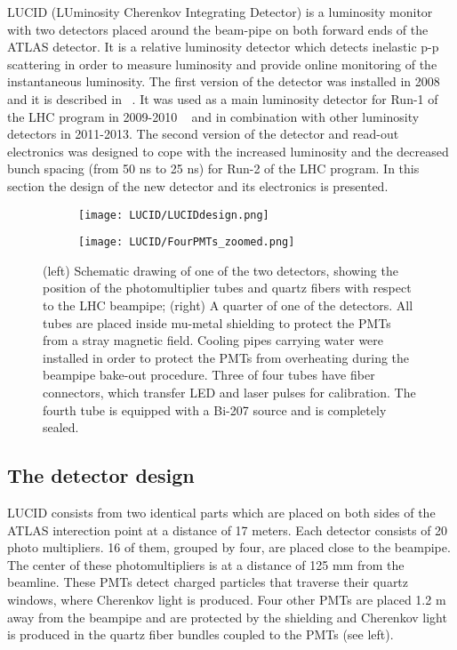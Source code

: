 LUCID (LUminosity Cherenkov Integrating Detector) is a luminosity monitor with two detectors placed around the beam-pipe on both forward ends of the ATLAS detector.
It is a relative luminosity detector which detects inelastic p-p scattering in order to measure luminosity and provide online monitoring of the instantaneous luminosity.
The first version of the detector was installed in 2008 and it is described in ~\cite{Aad:2008zzm}.
It was used as a main luminosity detector for Run-1 of the LHC program in 2009-2010 ~\cite{Aad:2013ucp} and in combination with other luminosity detectors in 2011-2013.
The second version of the detector and read-out electronics was designed to cope with 
the increased luminosity and the decreased bunch spacing (from 50 ns to 25 ns) for Run-2 of the LHC program.
In this section the design of the new detector and its electronics is presented. 

\begin{figure}
\centering
\begin{subfigure}{.5\textwidth}
  \centering
  \texttt{[image: LUCID/LUCIDdesign.png]}
\end{subfigure}%
\begin{subfigure}{.5\textwidth}
  \centering
  \texttt{[image: LUCID/FourPMTs\_zoomed.png]}
\end{subfigure}
\caption{(left) Schematic drawing of one of the two detectors, showing the position of the photomultiplier tubes 
and quartz fibers with respect to the LHC beampipe; (right) A quarter of one of the detectors. All tubes are 
placed inside mu-metal shielding to protect the PMTs from a stray magnetic field. Cooling pipes carrying water were installed in order 
to protect the PMTs from overheating during the beampipe bake-out procedure. Three of four tubes have fiber connectors, which
transfer LED and laser pulses for calibration. The fourth tube is equipped with a Bi-207 source and is completely 
sealed.}
\label{fig:LucidDrawing}
\end{figure}

\subsection{The detector design}
\label{subsec:newLucidDesign}

LUCID consists from two identical parts which are placed on both sides of the ATLAS interection point at a distance of 17 meters.
Each detector consists of 20 photo multipliers.
16 of them, grouped by four, are placed close to the beampipe. The center of these photomultipliers is at a distance of 125 mm from the beamline.
These PMTs detect charged particles that traverse their quartz windows, where Cherenkov light is produced.
Four other PMTs are placed 1.2 m away from the beampipe and are protected by the shielding and 
Cherenkov light is produced in the quartz fiber bundles coupled to the PMTs (see  left).

